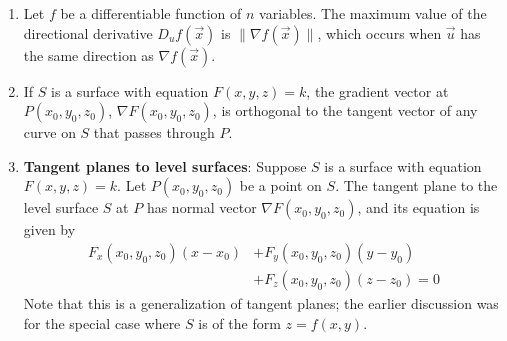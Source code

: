 \documentclass[10pt]{article}
\begin{document}
\begin{multicols}{2}
\begin{enumerate}
\begin{enumerate}
        \item Let $f$ be a differentiable function of $n$ variables. The maximum value of the directional derivative $D_u f(\vec{x})$ is $\| \nabla f(\vec{x}) \|$, which occurs when $\vec{u}$ has the same direction as $\nabla f(\vec{x})$.
        \item If $S$ is a surface with equation $F(x,y,z)=k$, the gradient vector at $P(x_0, y_0, z_0)$, $\nabla F(x_0, y_0, z_0)$, is orthogonal to the tangent vector of any curve on $S$ that passes through $P$.
        \item \textbf{Tangent planes to level surfaces}: Suppose $S$ is a surface with equation $F(x,y,z)=k$. Let $P(x_0, y_0, z_0)$ be a point on $S$. The tangent plane to the level surface $S$ at $P$ has normal vector $\nabla F(x_0, y_0, z_0)$, and its equation is given by
        \begin{align*}
            F_x(x_0, y_0, z_0)(x-x_0) &+ F_y(x_0, y_0, z_0)(y-y_0) \\ &+ F_z(x_0, y_0, z_0)(z-z_0)=0
        \end{align*}
        Note that this is a generalization of tangent planes; the earlier discussion was for the special case where $S$ is of the form $z=f(x,y)$.
    \end{enumerate}
    \columnbreak
    

\end{enumerate}
\end{multicols}
\end{document}
